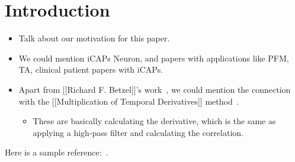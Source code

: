 \section{Introduction}

\begin{itemize}

    \item Talk about our motivation for this paper.

    \item We could mention iCAPs Neuron, and papers with applications like PFM, TA, clinical patient papers with iCAPs.

    \item Apart from [[Richard F. Betzel]]'s work~\cite{betzel2020temporal,esfahlani2020high,faskowitz2020edge}, we could mention the connection with the
    [[Multiplication of Temporal Derivatives]] method~\cite{shine2015estimation,shine2016dynamics}.

    \begin{itemize}
        \item These are basically calculating the derivative, which is the same as applying a high-pass filter and calculating the correlation.
    \end{itemize}

\end{itemize}

Here is a sample reference:~\cite{gitelman2003modeling}.